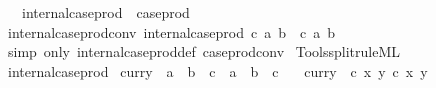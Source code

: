 \begin{isabellebody}
\ \ \ {\isachardoublequoteopen}internal{\isacharunderscore}{\kern0pt}case{\isacharunderscore}{\kern0pt}prod\ {\isasymequiv}\ case{\isacharunderscore}{\kern0pt}prod{\isachardoublequoteclose}\isanewline
\isanewline
{}\isamarkupfalse%
\ internal{\isacharunderscore}{\kern0pt}case{\isacharunderscore}{\kern0pt}prod{\isacharunderscore}{\kern0pt}conv{\isacharcolon}{\kern0pt}\ {\isachardoublequoteopen}internal{\isacharunderscore}{\kern0pt}case{\isacharunderscore}{\kern0pt}prod\ c\ {\isacharparenleft}{\kern0pt}a{\isacharcomma}{\kern0pt}\ b{\isacharparenright}{\kern0pt}\ {\isacharequal}{\kern0pt}\ c\ a\ b{\isachardoublequoteclose}\isanewline
%
\isadelimproof
\ \ %
\endisadelimproof
%
\isatagproof
{}\isamarkupfalse%
\ {\isacharparenleft}{\kern0pt}simp\ only{\isacharcolon}{\kern0pt}\ internal{\isacharunderscore}{\kern0pt}case{\isacharunderscore}{\kern0pt}prod{\isacharunderscore}{\kern0pt}def\ case{\isacharunderscore}{\kern0pt}prod{\isacharunderscore}{\kern0pt}conv{\isacharparenright}{\kern0pt}%
\endisatagproof
{\isafoldproof}%
%
\isadelimproof
\isanewline
%
\endisadelimproof
%
\isadelimML
\isanewline
%
\endisadelimML
%
\isatagML
{}\isamarkupfalse%
\ {\isacartoucheopen}Tools{\isacharslash}{\kern0pt}split{\isacharunderscore}{\kern0pt}rule{\isachardot}{\kern0pt}ML{\isacartoucheclose}%
\endisatagML
{\isafoldML}%
%
\isadelimML
\isanewline
%
\endisadelimML
\isanewline
{}\isamarkupfalse%
\ internal{\isacharunderscore}{\kern0pt}case{\isacharunderscore}{\kern0pt}prod%
\isadelimdocument
%
\endisadelimdocument
%
\isatagdocument
%
\isamarkuptrue%
%
\endisatagdocument
{\isafolddocument}%
%
\isadelimdocument
%
\endisadelimdocument
{}\isamarkupfalse%
\ curry\ {\isacharcolon}{\kern0pt}{\isacharcolon}{\kern0pt}\ {\isachardoublequoteopen}{\isacharparenleft}{\kern0pt}{\isacharprime}{\kern0pt}a\ {\isasymtimes}\ {\isacharprime}{\kern0pt}b\ {\isasymRightarrow}\ {\isacharprime}{\kern0pt}c{\isacharparenright}{\kern0pt}\ {\isasymRightarrow}\ {\isacharprime}{\kern0pt}a\ {\isasymRightarrow}\ {\isacharprime}{\kern0pt}b\ {\isasymRightarrow}\ {\isacharprime}{\kern0pt}c{\isachardoublequoteclose}\isanewline
\ \ \ {\isachardoublequoteopen}curry\ {\isacharequal}{\kern0pt}\ {\isacharparenleft}{\kern0pt}{\isasymlambda}c\ x\ y{\isachardot}{\kern0pt}\ c\ {\isacharparenleft}{\kern0pt}x{\isacharcomma}{\kern0pt}\ y{\isacharparenright}{\kern0pt}{\isacharparenright}{\kern0pt}{\isachardoublequoteclose}\isanewline

\end{isabellebody}
